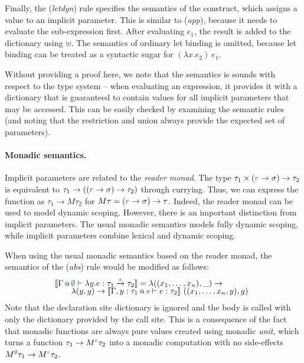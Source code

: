 Finally, the (\emph{letdyn}) rule specifies the semantics of the  construct, which 
assigns a value to an implicit parameter. This is similar to (\emph{app}), because it needs to 
evaluate the sub-expression first. After evaluating $e_1$, the result is added to the dictionary
using $\uplus$. The semantics of ordinary let binding is omitted, because let binding can be 
treated as a syntactic sugar for $(\lambda x.e_2)~e_1$.

Without providing a proof here, we note that the semantics is sounds with respect to the type 
system -- when evaluating an expression, it provides it with a dictionary that is guaranteed to
contain values for all implicit parameters that may be accessed. This can be easily checked by
examining the semantic rules (and noting that the restriction and union always provide the
expected set of parameters).

\paragraph{Monadic semantics.}
Implicit parameters are related to the \emph{reader mo\-nad}. The type 
$\tau_1 \times (\cclrd{r} \rightarrow \sigma) \rightarrow \tau_2$ is equivalent to
$\tau_1 \rightarrow ((\cclrd{r} \rightarrow \sigma) \rightarrow \tau_2)$ through currying. Thus, we can
express the function as $\tau_1 \rightarrow M\tau_2$ for $M\tau = (\cclrd{r} \rightarrow \sigma) \rightarrow \tau$.
Indeed, the reader monad can be used to model dynamic scoping. However, there is an important distinction
from implicit parameters. The usual monadic semantics models fully dynamic scoping, while implicit
parameters combine lexical and dynamic scoping.

When using the usual monadic semantics based on the reader monad, the semantics of the (\emph{abs})
rule would be modified as follows:
%
\begin{equation*}
\hspace{-0.5em}
\begin{array}{l}
  \sem{\coctx{\Gamma}{\cclrd{\emptyset}} \vdash \lambda y. e : \tau_1 \xrightarrow{\cclrd{s}} \tau_2 } = 
      \lambda ((x_1, \ldots, x_n), \_) \rightarrow\\[-0.25em]
  \qquad\lambda (y, g) \rightarrow \sem{ \coctx{\Gamma,y:\tau_1}{\cclrd{s}} \vdash e : \tau_2 }~((x_1, \ldots, x_n, y), g)      
\end{array}
\end{equation*}
%
Note that the declaration site dictionary
is ignored and the body is called with only the dictionary provided by the call site. This is
a consequence of the fact that monadic functions are always pure values created using monadic
\emph{unit}, which turns a function $\tau_1 \rightarrow \mtyp{\cclrd{r}}{\tau_2}$ into a monadic
computation with no side-effects $\mtyp{\cclrd{\emptyset}}{\tau_1 \rightarrow \mtyp{\cclrd{r}}{\tau_2}}$.

